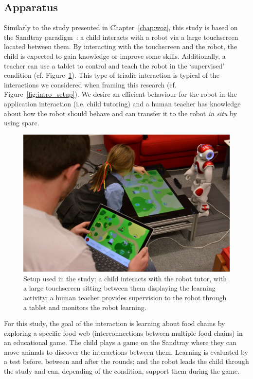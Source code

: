 \subsection{Apparatus}

Similarly to the study presented in Chapter~\ref{chap:woz}, this study is based on the Sandtray paradigm~\citep{baxter2012touchscreen}: a child interacts with a robot via a large touchscreen located between them. By interacting with the touchscreen and the robot, the child is expected to gain knowledge or improve some skills. Additionally, a teacher can use a tablet to control and teach the robot in the `supervised' condition (cf. Figure~\ref{fig:tutoring_setup}). This type of triadic interaction is typical of the interactions we considered when framing this research (cf. Figure~\ref{fig:intro_setup}). We desire an efficient behaviour for the robot in the application interaction (i.e. child tutoring) and a human teacher has knowledge about how the robot should behave and can transfer it to the robot \textit{in situ} by using \gls{sparc}.

\begin{figure}[ht]
	\centering
	\includegraphics[width=1\textwidth]{setup.jpg}
	\caption{Setup used in the study: a child interacts with the robot tutor, with a large touchscreen sitting between them displaying the learning activity; a human teacher provides supervision to the robot through a tablet and monitors the robot learning.}
	\label{fig:tutoring_setup}
\end{figure}

For this study, the goal of the interaction is learning about food chains by exploring a specific food web (interconnections between multiple food chains) in an educational game. The child plays a game on the Sandtray where they can move animals to discover the interactions between them. Learning is evaluated by a test before, between and after the rounds; and the robot leads the child through the study and can, depending of the condition, support them during the game.

